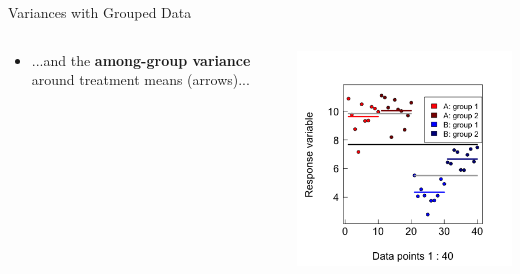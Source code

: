 \documentclass{beamer}
\begin{document}
\begin{frame}{Variances with Grouped Data}
  \begin{columns}[onlytextwidth] %
    \begin{column}{0.54\textwidth}
  \begin{itemize}
    \item ...and the \textbf{among-group variance} around treatment means (arrows)...
  \end{itemize}    \end{column}
    \hspace{0.02\textwidth} %
    \begin{column}{0.46\textwidth}
      \begin{center}
        \includegraphics[width=0.999\textwidth]{lectures/day_1_intro_to_mems/figures/unnamed-chunk-24-1.png}
      \end{center}
    \end{column}
  \end{columns}
\end{frame}
\end{document}
